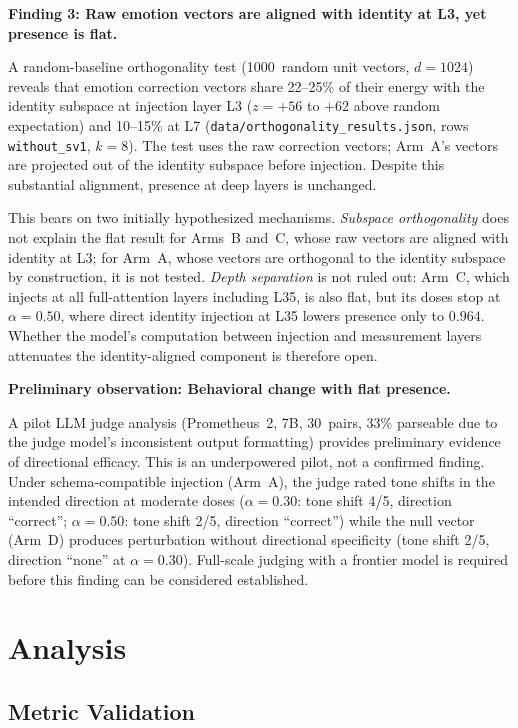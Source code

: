 \documentclass[11pt,a4paper]{article}
\begin{document}
\textbf{Finding 3: Raw emotion vectors are aligned with identity at L3,
yet presence is flat.}

A random-baseline orthogonality test (1000~random unit vectors, $d{=}1024$)
reveals that emotion correction vectors share 22--25\% of their energy with
the identity subspace at injection layer L3 ($z{=}{+}56$ to ${+}62$
above random expectation) and 10--15\% at L7
(\nolinkurl{data/orthogonality_results.json}, rows \texttt{without\_sv1},
$k{=}8$). The test uses the raw correction vectors; Arm~A's vectors are
projected out of the identity subspace before injection. Despite this substantial alignment, presence at
deep layers is unchanged.

This bears on two initially hypothesized mechanisms. \emph{Subspace
orthogonality} does not explain the flat result for Arms~B and~C, whose
raw vectors are aligned with identity at L3; for Arm~A, whose vectors are
orthogonal to the identity subspace by construction, it is not tested.
\emph{Depth separation} is not ruled out: Arm~C, which injects at all
full-attention layers including L35, is also flat, but its doses stop at
$\alpha = 0.50$, where direct identity injection at L35 lowers presence
only to $0.964$. Whether the model's computation between injection and
measurement layers attenuates the identity-aligned component is
therefore open.

\textbf{Preliminary observation: Behavioral change with flat presence.}

A pilot LLM judge analysis (Prometheus~2, 7B, 30~pairs, 33\% parseable
due to the judge model's inconsistent output formatting) provides
preliminary evidence of directional efficacy. This is an underpowered
pilot, not a confirmed finding. Under schema-compatible
injection (Arm~A), the judge rated tone shifts in the intended direction at
moderate doses ($\alpha{=}0.30$: tone shift 4/5, direction ``correct'';
$\alpha{=}0.50$: tone shift 2/5, direction ``correct'') while the null
vector (Arm~D) produces perturbation without directional specificity
(tone shift 2/5, direction ``none'' at $\alpha{=}0.30$). Full-scale
judging with a frontier model is required before this finding can be
considered established.

\section{Analysis}
\label{sec:analysis}

\subsection{Metric Validation}
\end{document}
